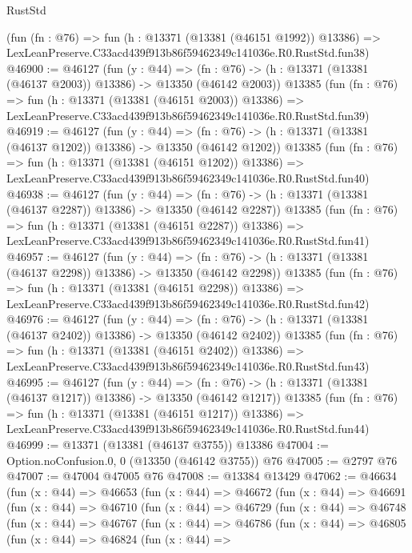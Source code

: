 \begin{lexlean}{RustStd}
\begin{coremodule}
    (fun (fn : @76) =>
    fun (h : @13371 (@13381 (@46151 @1992)) @13386) =>
    LexLeanPreserve.C33acd439f913b86f59462349c141036e.R0.RustStd.fun38)
@46900 := @46127
    (fun (y : @44) =>
    (fn : @76) -> (h : @13371 (@13381 (@46137 @2003)) @13386) -> @13350 (@46142 @2003))
    @13385
    (fun (fn : @76) =>
    fun (h : @13371 (@13381 (@46151 @2003)) @13386) =>
    LexLeanPreserve.C33acd439f913b86f59462349c141036e.R0.RustStd.fun39)
@46919 := @46127
    (fun (y : @44) =>
    (fn : @76) -> (h : @13371 (@13381 (@46137 @1202)) @13386) -> @13350 (@46142 @1202))
    @13385
    (fun (fn : @76) =>
    fun (h : @13371 (@13381 (@46151 @1202)) @13386) =>
    LexLeanPreserve.C33acd439f913b86f59462349c141036e.R0.RustStd.fun40)
@46938 := @46127
    (fun (y : @44) =>
    (fn : @76) -> (h : @13371 (@13381 (@46137 @2287)) @13386) -> @13350 (@46142 @2287))
    @13385
    (fun (fn : @76) =>
    fun (h : @13371 (@13381 (@46151 @2287)) @13386) =>
    LexLeanPreserve.C33acd439f913b86f59462349c141036e.R0.RustStd.fun41)
@46957 := @46127
    (fun (y : @44) =>
    (fn : @76) -> (h : @13371 (@13381 (@46137 @2298)) @13386) -> @13350 (@46142 @2298))
    @13385
    (fun (fn : @76) =>
    fun (h : @13371 (@13381 (@46151 @2298)) @13386) =>
    LexLeanPreserve.C33acd439f913b86f59462349c141036e.R0.RustStd.fun42)
@46976 := @46127
    (fun (y : @44) =>
    (fn : @76) -> (h : @13371 (@13381 (@46137 @2402)) @13386) -> @13350 (@46142 @2402))
    @13385
    (fun (fn : @76) =>
    fun (h : @13371 (@13381 (@46151 @2402)) @13386) =>
    LexLeanPreserve.C33acd439f913b86f59462349c141036e.R0.RustStd.fun43)
@46995 := @46127
    (fun (y : @44) =>
    (fn : @76) -> (h : @13371 (@13381 (@46137 @1217)) @13386) -> @13350 (@46142 @1217))
    @13385
    (fun (fn : @76) =>
    fun (h : @13371 (@13381 (@46151 @1217)) @13386) =>
    LexLeanPreserve.C33acd439f913b86f59462349c141036e.R0.RustStd.fun44)
@46999 := @13371 (@13381 (@46137 @3755)) @13386
@47004 := Option.noConfusion.{0, 0} (@13350 (@46142 @3755)) @76
@47005 := @2797 @76
@47007 := @47004 @47005 @76
@47008 := @13384 @13429
@47062 := @46634
    (fun (x : @44) =>
    @46653
      (fun (x : @44) =>
      @46672
        (fun (x : @44) =>
        @46691
          (fun (x : @44) =>
          @46710
            (fun (x : @44) =>
            @46729
              (fun (x : @44) =>
              @46748
                (fun (x : @44) =>
                @46767
                  (fun (x : @44) =>
                  @46786
                    (fun (x : @44) =>
                    @46805
                      (fun (x : @44) =>
                      @46824
                        (fun (x : @44) =>

\end{coremodule}
\end{lexlean}
